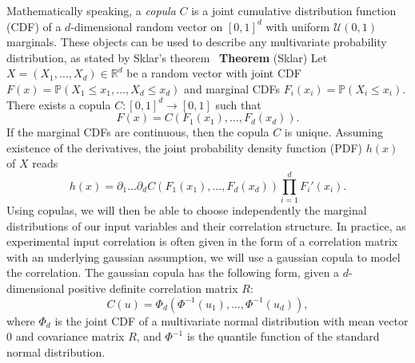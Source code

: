 \documentclass[preprint,11pt]{elsarticle}
\begin{document}
Mathematically speaking, a \textit{copula} $C$ is a joint cumulative distribution function (CDF) of a $d$-dimensional random vector on $[0,1]^d$ with uniform $\mathcal{U}(0,1)$ marginals. These objects can be used to describe any multivariate probability distribution, as stated by Sklar's theorem~\cite{Sklar1959} \smallbreak
\textbf{Theorem} (Sklar) Let $X=(X_1,\dots,X_d)\in \mathbb R^d$ be a random vector with joint CDF $F(x)=\mathbb{P}(X_1\leq x_1,\dots,X_d\leq x_d)$ and marginal CDFs $F_i(x_i)=\mathbb{P}(X_i\leq x_i)$. There exists a copula $C:[0,1]^d\to[0,1]$ such that
\begin{equation}
    F(x)=C(F_1(x_1),\dots,F_d(x_d)).
\end{equation}
If the marginal CDFs are continuous, then the copula $C$ is unique. Assuming existence of the derivatives, the joint probability density function (PDF) $h(x)$ of $X$ reads
\begin{equation}
    h(x)=\partial_1\dots\partial_dC(F_1(x_1),\dots,F_d(x_d))\prod_{i=1}^d F_i'(x_i).
\end{equation}
\smallbreak
Using copulas, we will then be able to choose independently the marginal distributions of our input variables and their correlation structure. In practice, as experimental input correlation is often given in the form of a correlation matrix with an underlying gaussian assumption, we will use a gaussian copula to model the correlation. The gaussian copula has the following form, given a $d$-dimensional positive definite correlation matrix $R$:
\begin{equation}
    C(u)=\Phi_d(\Phi^{-1}(u_1),\dots,\Phi^{-1}(u_d)),
\end{equation}
where $\Phi_d$ is the joint CDF of a multivariate normal distribution with mean vector $0$ and covariance matrix $R$, and $\Phi^{-1}$ is the quantile function of the standard normal distribution.
\end{document}
